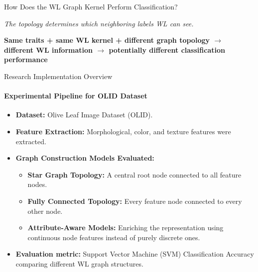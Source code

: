 \documentclass[aspectratio=169, 11pt]{beamer}
\begin{document}
\begin{frame}{How Does the WL Graph Kernel Perform Classification?}
    \vspace{0.1cm}
    \begin{center}
    \end{center}

    \vspace{0.12cm}
    \begin{center}
    {\scriptsize\itshape The topology determines which neighboring labels WL
    can see.}

    \vspace{0.1cm}
    {\footnotesize\bfseries Same traits + same WL kernel + different graph
    topology $\rightarrow$ different WL information $\rightarrow$ potentially
    different classification performance}
    \end{center}
\end{frame}

\begin{frame}{Research Implementation Overview}
    \framesubtitle{Experimental Pipeline for OLID Dataset}

    \begin{itemize}
        \item \textbf{Dataset:} Olive Leaf Image Dataset (OLID).
        \item \textbf{Feature Extraction:} Morphological, color, and texture features were extracted.
        \item \textbf{Graph Construction Models Evaluated:}
        \begin{itemize}
            \item \textbf{Star Graph Topology:} A central root node connected to all feature nodes.
            \item \textbf{Fully Connected Topology:} Every feature node connected to every other node.
            \item \textbf{Attribute-Aware Models:} Enriching the representation using continuous node features instead of purely discrete ones.
        \end{itemize}
        \item \textbf{Evaluation metric:} Support Vector Machine (SVM) Classification Accuracy comparing different WL graph structures.
    \end{itemize}
\end{frame}
\end{document}
